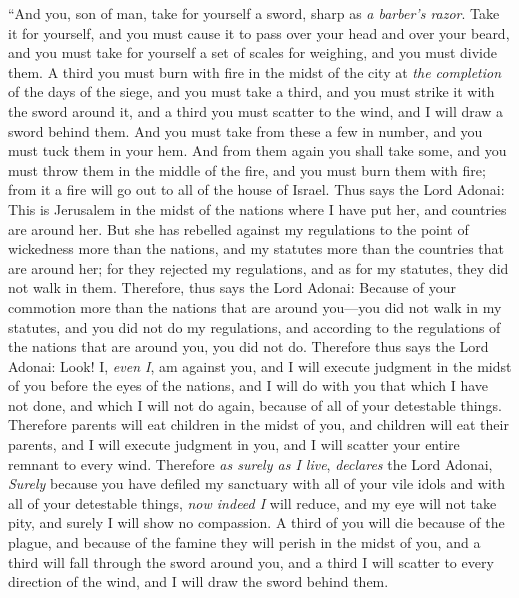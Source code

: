 \begin{biblechapter} %
\verse “And you, son of man, take for yourself a sword, sharp as \textit{a barber’s razor}. Take it for yourself, and you must cause it to pass over your head and over your beard, and you must take for yourself a set of scales for weighing, and you must divide them.
\verse A third you must burn with fire in the midst of the city at \textit{the completion} of the days of the siege, and you must take a third, and you must strike it with the sword around it, and a third you must scatter to the wind, and I will draw a sword behind them.
\verse And you must take from these a few in number, and you must tuck them in your hem.
\verse And from them again you shall take some, and you must throw them in the middle of the fire, and you must burn them with fire; from it a fire will go out to all of the house of Israel.
\verse Thus says the Lord Adonai: This is Jerusalem in the midst of the nations where I have put her, and countries are around her.
\verse But she has rebelled against my regulations to the point of wickedness more than the nations, and my statutes more than the countries that are around her; for they rejected my regulations, and as for my statutes, they did not walk in them.
\verse Therefore, thus says the Lord Adonai: Because of your commotion more than the nations that are around you—you did not walk in my statutes, and you did not do my regulations, and according to the regulations of the nations that are around you, you did not do.
\verse Therefore thus says the Lord Adonai: Look! I, \textit{even I}, am against you, and I will execute judgment in the midst of you before the eyes of the nations,
\verse and I will do with you that which I have not done, and which I will not do again, because of all of your detestable things.
\verse Therefore parents will eat children in the midst of you, and children will eat their parents, and I will execute judgment in you, and I will scatter your entire remnant to every wind.
\verse Therefore \textit{as surely as I live}, \textit{declares} the Lord Adonai, \textit{Surely} because you have defiled my sanctuary with all of your vile idols and with all of your detestable things, \textit{now indeed I} will reduce, and my eye will not take pity, and surely I will show no compassion.
\verse A third of you will die because of the plague, and because of the famine they will perish in the midst of you, and a third will fall through the sword around you, and a third I will scatter to every direction of the wind, and I will draw the sword behind them.

\end{biblechapter}
